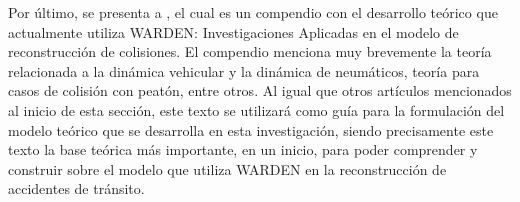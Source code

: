 \begin{singlespace}
\hspace{1 cm} Por último, se presenta a \citet{Wardenia}, el cual es un compendio con el desarrollo teórico que actualmente utiliza WARDEN: Investigaciones Aplicadas en el modelo de reconstrucción de colisiones. El compendio menciona muy brevemente la teoría relacionada a la dinámica vehicular y la dinámica de neumáticos, teoría para casos de colisión con peatón, entre otros. Al igual que otros artículos mencionados al inicio de esta sección, este texto se utilizará como guía para la formulación del modelo teórico que se desarrolla en esta investigación, siendo precisamente este texto la base teórica más importante, en un inicio, para poder comprender y construir sobre el modelo que utiliza WARDEN en la reconstrucción de accidentes de tránsito.


\end{singlespace}